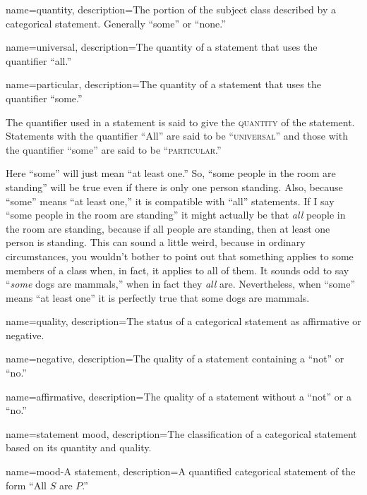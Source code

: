 {
name=quantity,
description={The portion of the subject class described by a categorical statement. Generally ``some'' or ``none.''}
}

{
name=universal,
description={The quantity of a statement that uses the quantifier ``all.''}
}

{
name=particular,
description={The quantity of a statement that uses the quantifier ``some.''}
}

The quantifier used in a statement is said to give the \textsc{\gls{quantity}} \label{def:Quantity} of the statement. Statements with the quantifier ``All'' are said to be ``\textsc{\gls{universal}}'' and those with the quantifier ``some'' are said to be ``\textsc{\gls{particular}}.''

Here ``some'' will just mean ``at least one.'' So, ``some people in the room are standing'' will be true even if there is only one person standing. Also, because ``some'' means ``at least one,'' it is compatible with ``all'' statements. If I say ``some people in the room are standing'' it might actually be that \textit{all} people in the room are standing, because if all people are standing, then at least one person is standing. This can sound a little weird, because in ordinary circumstances, you wouldn't bother to point out that something applies to some members of a class when, in fact, it applies to all of them. It sounds odd to say ``\textit{some} dogs are mammals,'' when in fact they \textit{all} are. Nevertheless, when ``some'' means ``at least one'' it is perfectly true that some dogs are mammals.


{
name=quality,
description={The status of a categorical statement as affirmative or negative.}
}

{
name=negative,
description={The quality of a statement containing a ``not'' or ``no.''}
}

{
name=affirmative,
description={The quality of a statement without a ``not'' or a ``no.''}
}



{
name=statement mood,
description={The classification of a categorical statement based on its quantity and quality.}
}

{
name=mood-A statement,
description={A quantified categorical statement of the form ``All $S$ are $P$.''}
}

